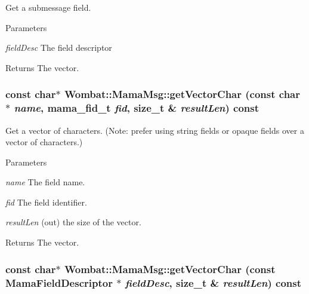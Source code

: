 Get a submessage field. 
\begin{DoxyParams}{Parameters}
\item[{\em fieldDesc}]The field descriptor \end{DoxyParams}
\begin{DoxyReturn}{Returns}
The vector. 
\end{DoxyReturn}
\hypertarget{classWombat_1_1MamaMsg_a6a5722d1d645f546d6b035f7bf0ab30a}{
\subsubsection[{getVectorChar}]{\setlength{\rightskip}{0pt plus 5cm}const char$\ast$ Wombat::MamaMsg::getVectorChar (const char $\ast$ {\em name}, \/  mama\_\-fid\_\-t {\em fid}, \/  size\_\-t \& {\em resultLen}) const}}
\label{classWombat_1_1MamaMsg_a6a5722d1d645f546d6b035f7bf0ab30a}


Get a vector of characters. (Note: prefer using string fields or opaque fields over a vector of characters.) 
\begin{DoxyParams}{Parameters}
\item[{\em name}]The field name. \item[{\em fid}]The field identifier. \item[{\em resultLen}](out) the size of the vector. \end{DoxyParams}
\begin{DoxyReturn}{Returns}
The vector. 
\end{DoxyReturn}
\hypertarget{classWombat_1_1MamaMsg_a2529f77c57588e32a954fbc48cde67ff}{
\subsubsection[{getVectorChar}]{\setlength{\rightskip}{0pt plus 5cm}const char$\ast$ Wombat::MamaMsg::getVectorChar (const {\bf MamaFieldDescriptor} $\ast$ {\em fieldDesc}, \/  size\_\-t \& {\em resultLen}) const}}
\label{classWombat_1_1MamaMsg_a2529f77c57588e32a954fbc48cde67ff}


